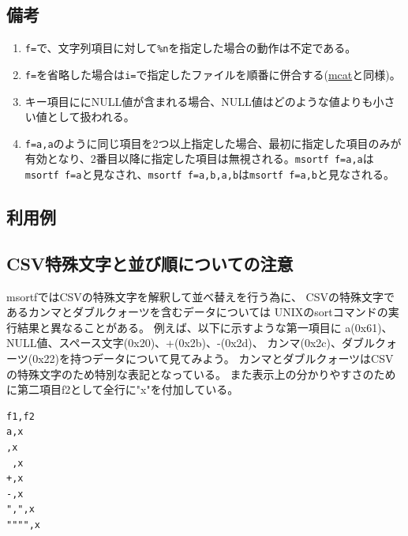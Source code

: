 \begin{table}[htbp]
{\begin{tabular}{ll}
\end{tabular} 
}
\end{table}
 
\subsection*{備考}
\begin{enumerate}
\item \verb|f=|で、文字列項目に対して\verb|%n|を指定した場合の動作は不定である。
\item \verb|f=|を省略した場合は\verb|i=|で指定したファイルを順番に併合する(\hyperref[sect:mcat]{mcat}と同様)。
\item キー項目ににNULL値が含まれる場合、NULL値はどのような値よりも小さい値として扱われる。
\item \verb|f=a,a|のように同じ項目を2つ以上指定した場合、最初に指定した項目のみが有効となり、2番目以降に指定した項目は無視される。\verb|msortf f=a,a|は\verb|msortf f=a|と見なされ、\verb|msortf f=a,b,a,b|は\verb|msortf f=a,b|と見なされる。

\end{enumerate}

\subsection*{利用例}



\subsection*{CSV特殊文字と並び順についての注意}
msortfではCSVの特殊文字を解釈して並べ替えを行う為に、
CSVの特殊文字であるカンマとダブルクォーツを含むデータについては
UNIXのsortコマンドの実行結果と異なることがある。
例えば、以下に示すような第一項目に
a(0x61)、NULL値、スペース文字(0x20)、+(0x2b)、-(0x2d)、
カンマ(0x2c)、ダブルクォーツ(0x22)を持つデータについて見てみよう。
カンマとダブルクォーツはCSVの特殊文字のため特別な表記となっている。
また表示上の分かりやすさのために第二項目f2として全行に"x"を付加している。\\

\begin{Verbatim}[baselinestretch=0.7,frame=single,fontsize=\small]
f1,f2
a,x
,x
 ,x
+,x
-,x
",",x
"""",x
\end{Verbatim}

